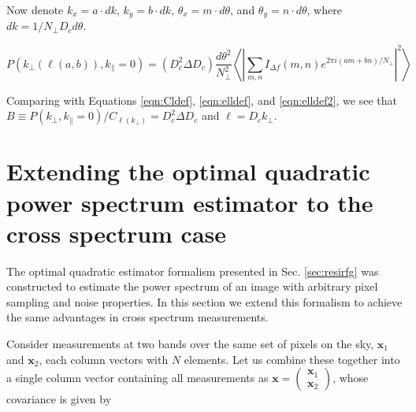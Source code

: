 \documentclass[numberedappendix]{emulateapj}
\newcommand{\xb}{\mathbf{x}}
\begin{document}
Now denote $k_x=a\cdot dk$, $k_y=b\cdot dk$, $\theta_x=m\cdot d\theta$, and $\theta_y=n\cdot d\theta$, where $dk = 1/N_\perp D_c d\theta$. 

\begin{equation}
P(k_\perp(\ell(a,b)),k_\parallel=0) =(D_c^2 \Delta D_c)
\frac{d\theta^2}{N_\perp^2}\left\langle\left|\sum_{m,n}I_{\Delta f}(m,n)e^{2\pi i(am + bn)/N_\perp}\right|^2\right\rangle
\end{equation}

Comparing with Equations \ref{eqn:Cldef}, \ref{eqn:elldef}, and \ref{eqn:elldef2}, we see that $B\equiv P(k_\perp,k_\parallel=0)/ C_{\ell(k_\perp)}=D_c^2 \Delta D_c$ and $\ell=D_c k_\perp$.


\section{Extending the optimal quadratic power spectrum estimator to the cross spectrum case}
\label{sec:optimalestimatorforcrossspectrum}

The optimal quadratic estimator formalism presented in Sec. \ref{sec:resirfg} was constructed to estimate the power spectrum of an image with arbitrary pixel sampling and noise properties. In this section we extend this formalism to achieve the same advantages in cross spectrum measurements. 

Consider measurements at two bands over the same set of pixels on the sky, $\xb_1$ and $\xb_2$, each column vectors with $N$ elements. Let us combine these together into a single column vector containing all measurements as $\xb=\left(\begin{matrix}\xb_1 \\ \xb_2  \end{matrix}\right)$, whose covariance is given by 
\end{document}
